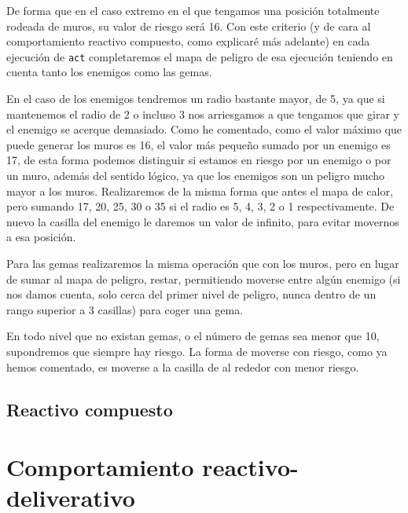 \documentclass[10pt, spanish]{article}
\begin{document}
De forma que en el caso extremo en el que tengamos una posición totalmente rodeada de muros, su valor de riesgo será 16. Con este criterio (y de cara al comportamiento reactivo compuesto, como explicaré más adelante) en cada ejecución de \texttt{act} completaremos el mapa de peligro de esa ejecución teniendo en cuenta tanto los enemigos como las gemas.


En el caso de los enemigos tendremos un radio bastante mayor, de 5, ya que si mantenemos el radio de 2 o incluso 3 nos arriesgamos a que tengamos que girar y el enemigo se acerque demasiado. Como he comentado, como el valor máximo que puede generar los muros es 16, el valor más pequeño sumado por un enemigo es 17, de esta forma podemos distinguir si estamos en riesgo por un enemigo o por un muro, además del sentido lógico, ya que los enemigos son un peligro mucho mayor a los muros. Realizaremos de la misma forma que antes el mapa de calor, pero sumando 17, 20, 25, 30 o 35 si el radio es 5, 4, 3, 2 o 1 respectivamente. De nuevo la casilla del enemigo le daremos un valor de infinito, para evitar movernos a esa posición.

Para las gemas realizaremos la misma operación que con los muros, pero en lugar de sumar al mapa de peligro, restar, permitiendo moverse entre algún enemigo (si nos damos cuenta, solo cerca del primer nivel de peligro, nunca dentro de un rango superior a 3 casillas) para coger una gema.

En todo nivel que no existan gemas, o el número de gemas sea menor que 10, supondremos que siempre hay riesgo. La forma de moverse con riesgo, como ya hemos comentado, es moverse a la casilla de al rededor con menor riesgo.


\subsection{Reactivo compuesto}

\section{Comportamiento reactivo-deliverativo}
\end{document}

